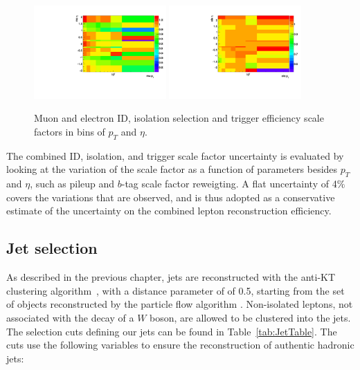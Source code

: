 \begin{figure}[hbtp]
 \begin{center}
   \includegraphics[width=0.45\textwidth]{Figures/Analysis_1_Diagrams/2d_mu_pt_eta_full_id_iso_hlt_data_over_mc.pdf}
   \includegraphics[width=0.45\textwidth]{Figures/Analysis_1_Diagrams/2d_ele_pt_eta_full_id_iso_hlt_data_over_mc.pdf}
   \caption{Muon and electron ID, isolation selection and trigger efficiency scale factors in bins of $p_{T}$ and $\eta$.}
   \label{fig:effSFHLT}
 \end{center}
\end{figure}

\par The combined ID, isolation, and trigger scale factor
uncertainty is evaluated by looking at the variation of the scale
factor as a function of parameters besides $p_T$ and $\eta$, such as
pileup and $b$-tag scale factor reweigting.  A flat uncertainty of 4$\%$
covers the variations that are observed, and is thus adopted as a
conservative estimate of the uncertainty on the combined lepton
reconstruction efficiency.  

\subsection{Jet selection}
\label{jet_selection_overview}

\par As described in the previous chapter, jets are reconstructed with
the anti-KT clustering algorithm~\cite{Cacciari:2008gp}, with a
distance parameter of of 0.5, starting from the set of objects
reconstructed by the particle flow algorithm
\cite{CMS-PAS-PFT-09-001}. Non-isolated leptons, not associated
with the decay of a $W$ boson, are allowed to be clustered into the
jets.  The selection cuts defining our jets can 
be found in Table~\ref{tab:JetTable}.  The cuts use the following
variables to ensure the reconstruction of authentic hadronic jets:

